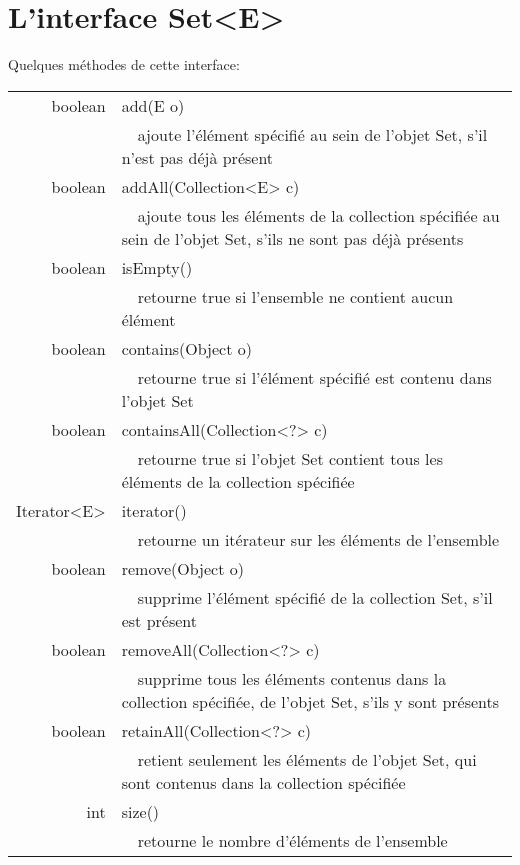 \documentclass[iutinfo,a4paper,nocorrections,10pt]{ustl-tdtp}
\date{\annee{2017}--\annee{2018}}
\begin{document}
\maketitle
\thispagestyle{empty}


\section{L'interface Set<E>}

Quelques méthodes de cette interface:

\begin{center}
\begin{tabular}{|r|l|}
\hline
boolean & add(E o)\\
&~~ajoute l'élément spécifié au sein de l'objet Set, s'il n'est pas déjà présent\\

\hline
boolean & addAll(Collection<E> c)\\
&~~ajoute tous les éléments de la collection spécifiée au sein de l'objet Set, s'ils ne sont pas déjà présents\\

\hline
  boolean &isEmpty()\\
&~~retourne true si l'ensemble ne contient aucun élément\\

 \hline
 boolean& contains(Object o)\\
&~~retourne true si l'élément spécifié est contenu dans l'objet Set\\

\hline
 boolean &containsAll(Collection<?> c)\\
&~~retourne true si l'objet Set contient tous les éléments de la collection spécifiée\\

\hline
 Iterator<E> & iterator()\\
&~~retourne un itérateur sur les éléments de l'ensemble\\
\hline
 boolean &remove(Object o)\\
&~~supprime l'élément spécifié de la collection Set, s'il est présent\\

\hline
 boolean &removeAll(Collection<?> c)\\
&~~supprime tous les éléments contenus dans la collection spécifiée, de l'objet Set, s'ils y sont présents\\
\hline
 boolean &retainAll(Collection<?> c)\\
&~~retient seulement les éléments de l'objet Set, qui sont contenus dans la collection spécifiée\\
\hline
 int& size()\\
&~~retourne le nombre d'éléments de l'ensemble\\

\hline
\end{tabular}
\end{center}
\end{document}
